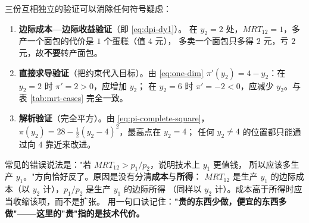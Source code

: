 三份互相独立的验证可以消除任何符号疑虑：

\begin{enumerate}
  \item \textbf{边际成本—边际收益验证}（即 \eqref{eq:dpi-dy1}）。
        在 $y_2=2$ 处，$MRT_{12}=1$，多产一个面包的代价是 $1$ 个蛋糕（值 $4$ 元），
        多卖一个面包只多得 $2$ 元，亏 $2$ 元，故\textbf{不要}转产面包。
  \item \textbf{直接求导验证}（把约束代入目标）。由 \eqref{eq:one-dim}
        $\pi'(y_2)=4-y_2$：在 $y_2=2$ 时 $\pi'=2>0$，应增加 $y_2$；
        在 $y_2=6$ 时 $\pi'=-2<0$，应减少 $y_2$。与表 \ref{tab:mrt-cases} 完全一致。
  \item \textbf{解析验证}（完全平方）。由 \eqref{eq:pi-complete-square}，
        $\pi(y_2)=28-\frac12(y_2-4)^2$，最高点在 $y_2=4$；
        任何 $y_2\neq 4$ 的位置都只能通过向 $4$ 靠近来改进。
\end{enumerate}

\begin{remark}[一个高频误判]
常见的错误说法是："若 $MRT_{12}>p_1/p_2$，说明技术上 $y_1$ 更值钱，
所以应该多生产 $y_1$。"方向恰好反了。原因是没有分清\textbf{成本}与\textbf{所得}：
$MRT_{12}$ 是生产 $y_1$ 的边际成本（以 $y_2$ 计），$p_1/p_2$ 是生产 $y_1$ 的边际所得
（同样以 $y_2$ 计）。成本高于所得时应当收缩该项，而不是扩张。
用一句口诀记住：\textbf{"贵的东西少做，便宜的东西多做"——这里的"贵"指的是技术代价。}
\end{remark}

